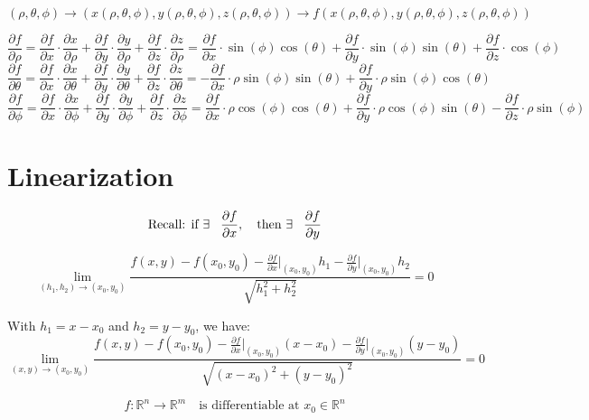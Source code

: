 \documentclass[11pt]{article}
\begin{document}
\[
(\rho, \theta, \phi) \rightarrow (x(\rho, \theta, \phi), y(\rho, \theta, \phi), z(\rho, \theta, \phi)) \rightarrow f(x(\rho, \theta, \phi), y(\rho, \theta, \phi), z(\rho, \theta, \phi))
\]

\[
\frac{\partial f}{\partial \rho} = \frac{\partial f}{\partial x} \cdot \frac{\partial x}{\partial \rho} + \frac{\partial f}{\partial y} \cdot \frac{\partial y}{\partial \rho} + \frac{\partial f}{\partial z} \cdot \frac{\partial z}{\partial \rho} = \frac{\partial f}{\partial x} \cdot \sin(\phi) \cos(\theta) + \frac{\partial f}{\partial y} \cdot \sin(\phi) \sin(\theta) + \frac{\partial f}{\partial z} \cdot \cos(\phi)
\]
\[
\frac{\partial f}{\partial \theta} = \frac{\partial f}{\partial x} \cdot \frac{\partial x}{\partial \theta} + \frac{\partial f}{\partial y} \cdot \frac{\partial y}{\partial \theta} + \frac{\partial f}{\partial z} \cdot \frac{\partial z}{\partial \theta} = -\frac{\partial f}{\partial x} \cdot \rho \sin(\phi) \sin(\theta) + \frac{\partial f}{\partial y} \cdot \rho \sin(\phi) \cos(\theta)
\]
\[
\frac{\partial f}{\partial \phi} = \frac{\partial f}{\partial x} \cdot \frac{\partial x}{\partial \phi} + \frac{\partial f}{\partial y} \cdot \frac{\partial y}{\partial \phi} + \frac{\partial f}{\partial z} \cdot \frac{\partial z}{\partial \phi} = \frac{\partial f}{\partial x} \cdot \rho \cos(\phi) \cos(\theta) + \frac{\partial f}{\partial y} \cdot \rho \cos(\phi) \sin(\theta) - \frac{\partial f}{\partial z} \cdot \rho \sin(\phi)
\]

\section{Linearization}
\[
\text{Recall:   if } \exists \hspace{0.3cm} \frac{\partial f}{\partial x}, \quad \text{then } \exists \hspace{0.3cm} \frac{\partial f}{\partial y}
\]

\[
\lim_{(h_1,h_2) \to (x_0, y_0)} \frac{f(x,y) - f(x_0, y_0) - \frac{\partial f}{\partial x} \big|_{(x_0, y_0)} h_1 - \frac{\partial f}{\partial y} \big|_{(x_0, y_0)} h_2}{\sqrt{h_1^2 + h_2^2}} = 0
\]

With \( h_1 = x - x_0 \) and \( h_2 = y - y_0 \), we have:
\[
\lim_{(x,y) \to (x_0, y_0)} \frac{f(x,y) - f(x_0, y_0) - \frac{\partial f}{\partial x} \big|_{(x_0, y_0)} (x - x_0) - \frac{\partial f}{\partial y} \big|_{(x_0, y_0)} (y - y_0)}{\sqrt{(x - x_0)^2 + (y - y_0)^2}} = 0
\]

\[
f : \mathbb{R}^n \rightarrow \mathbb{R}^m \quad \text{is differentiable at } x_0 \in \mathbb{R}^n
\]
\end{document}
